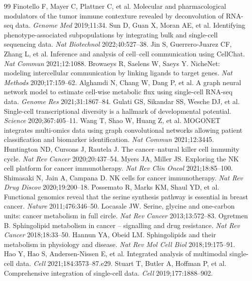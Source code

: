 \documentclass[modern,large,numbered,nocrop]{oup-authoring-template}
\begin{document}
\begin{thebibliography}{99}
 Finotello F, Mayer C, Plattner C, et al. Molecular and pharmacological modulators of the tumor immune contexture revealed by deconvolution of RNA-seq data. \textit{Genome Med} 2019;11:34.
 Sun D, Guan X, Moran AE, et al. Identifying phenotype-associated subpopulations by integrating bulk and single-cell sequencing data. \textit{Nat Biotechnol} 2022;40:527--38.
 Jin S, Guerrero-Juarez CF, Zhang L, et al. Inference and analysis of cell--cell communication using CellChat. \textit{Nat Commun} 2021;12:1088.
 Browaeys R, Saelens W, Saeys Y. NicheNet: modeling intercellular communication by linking ligands to target genes. \textit{Nat Methods} 2020;17:159--62.
 Alghamdi N, Chang W, Dang P, et al. A graph neural network model to estimate cell-wise metabolic flux using single-cell RNA-seq data. \textit{Genome Res} 2021;31:1867--84.
 Gulati GS, Sikandar SS, Wesche DJ, et al. Single-cell transcriptional diversity is a hallmark of developmental potential. \textit{Science} 2020;367:405--11.
 Wang T, Shao W, Huang Z, et al. MOGONET integrates multi-omics data using graph convolutional networks allowing patient classification and biomarker identification. \textit{Nat Commun} 2021;12:3445.
 Huntington ND, Cursons J, Rautela J. The cancer--natural killer cell immunity cycle. \textit{Nat Rev Cancer} 2020;20:437--54.
 Myers JA, Miller JS. Exploring the NK cell platform for cancer immunotherapy. \textit{Nat Rev Clin Oncol} 2021;18:85--100.
 Shimasaki N, Jain A, Campana D. NK cells for cancer immunotherapy. \textit{Nat Rev Drug Discov} 2020;19:200--18.
 Possemato R, Marks KM, Shaul YD, et al. Functional genomics reveal that the serine synthesis pathway is essential in breast cancer. \textit{Nature} 2011;476:346--50.
 Locasale JW. Serine, glycine and one-carbon units: cancer metabolism in full circle. \textit{Nat Rev Cancer} 2013;13:572--83.
 Ogretmen B. Sphingolipid metabolism in cancer -- signalling and drug resistance. \textit{Nat Rev Cancer} 2018;18:33--50.
 Hannun YA, Obeid LM. Sphingolipids and their metabolism in physiology and disease. \textit{Nat Rev Mol Cell Biol} 2018;19:175--91.
 Hao Y, Hao S, Andersen-Nissen E, et al. Integrated analysis of multimodal single-cell data. \textit{Cell} 2021;184:3573--87.e29.
 Stuart T, Butler A, Hoffman P, et al. Comprehensive integration of single-cell data. \textit{Cell} 2019;177:1888--902.

\end{thebibliography}
\end{document}
